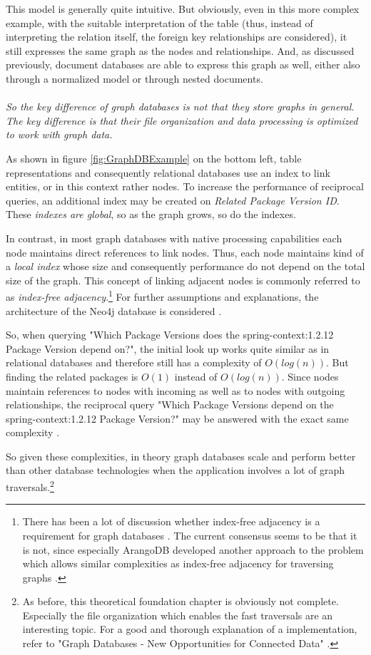 This model is generally quite intuitive. But obviously, even in this more complex example, with the suitable interpretation of the table (thus, instead of interpreting the relation itself, the foreign key relationships are considered), it still expresses the same graph as the nodes and relationships. And, as discussed previously, document databases are able to express this graph as well, either also through a normalized model or through nested documents.\\\\ 
\emph{So the key difference of graph databases is not that they store graphs in general. The key difference is that their file organization and data processing is optimized to work with graph data.}\par
As shown in figure \ref{fig:GraphDBExample} on the bottom left, table representations and consequently relational databases use an index to link entities, or in this context rather nodes. To increase the performance of reciprocal queries, an additional index may be created on \emph{Related Package Version ID}. These \emph{indexes are global}, so as the graph grows, so do the indexes.\par 
In contrast, in most graph databases with native processing capabilities each node maintains direct references to link nodes. Thus, each node maintains kind of a \emph{local index} whose size and consequently performance do not depend on the total size of the graph. This concept of linking adjacent nodes is commonly referred to as \emph{index-free adjacency}.\footnote{There has been a lot of discussion whether index-free adjacency is a requirement for graph databases \cite{graphdbdiscussion}. The current consensus seems to be that it is not, since especially ArangoDB developed another approach to the problem which allows similar complexities as index-free adjacency for traversing graphs \cite{arangodbhybridindexes}.} For further assumptions and explanations, the architecture of the Neo4j database is considered \cite{neo4j}.\par
So, when querying "Which Package Versions does the spring-context:1.2.12 Package Version depend on?", the initial look up works quite similar as in relational databases and therefore still has a complexity of $O(log(n))$. But finding the related packages is $O(1)$ instead of $O(log(n))$. Since nodes maintain references to nodes with incoming as well as to nodes with outgoing relationships, the reciprocal query "Which Package Versions depend on the spring-context:1.2.12 Package Version?" may be answered with the exact same complexity \cite{neo4j}.\par 
So given these complexities, in theory graph databases scale and perform better than other database technologies when the application involves a lot of graph traversals.\footnote{As before, this theoretical foundation chapter is obviously not complete. Especially the file organization which enables the fast traversals are an interesting topic. For a good and thorough explanation of a implementation, refer to "Graph Databases - New Opportunities for Connected Data" \cite{neo4j}.}

